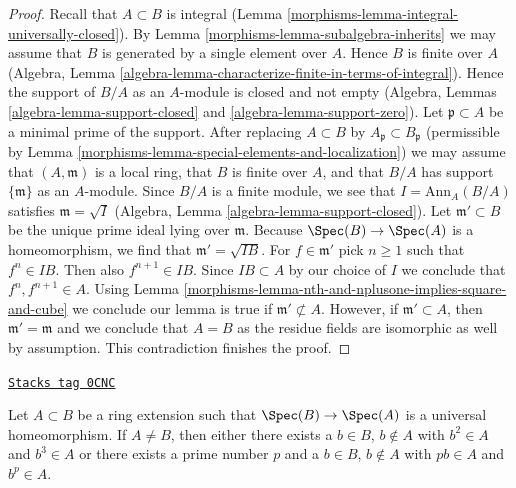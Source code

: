 \begin{proof}

Recall that $A \subset B$ is integral
(Lemma \ref{morphisms-lemma-integral-universally-closed}).
By Lemma \ref{morphisms-lemma-subalgebra-inherits}
we may assume that $B$ is generated by a single element
over $A$. Hence $B$ is finite over $A$
(Algebra, Lemma \ref{algebra-lemma-characterize-finite-in-terms-of-integral}).
Hence the support of $B/A$ as an $A$-module is
closed and not empty (Algebra, Lemmas
\ref{algebra-lemma-support-closed} and \ref{algebra-lemma-support-zero}).
Let $\mathfrak p \subset A$ be a minimal prime
of the support. After replacing $A \subset B$ by
$A_\mathfrak p \subset B_\mathfrak p$ (permissible by
Lemma \ref{morphisms-lemma-special-elements-and-localization})
we may assume that $(A, \mathfrak m)$ is a local ring,
that $B$ is finite over $A$, and that $B/A$ has support $\{\mathfrak m\}$
as an $A$-module. Since $B/A$ is a finite module,
we see that $I = \text{Ann}_A(B/A)$ satisfies $\mathfrak m = \sqrt{I}$
(Algebra, Lemma \ref{algebra-lemma-support-closed}).
Let $\mathfrak m' \subset B$ be the unique prime ideal lying over
$\mathfrak m$. Because $\Spec(B) \to \Spec(A)$ is a homeomorphism,
we find that $\mathfrak m' = \sqrt{IB}$.
For $f \in \mathfrak m'$ pick $n \geq 1$ such that
$f^n \in IB$. Then also $f^{n + 1} \in IB$.
Since $IB \subset A$ by our choice of $I$ we conclude that
$f^n, f^{n + 1} \in A$. Using
Lemma \ref{morphisms-lemma-nth-and-nplusone-implies-square-and-cube}
we conclude our lemma is true if $\mathfrak m' \not \subset A$.
However, if $\mathfrak m' \subset A$, then $\mathfrak m' = \mathfrak m$
and we conclude that $A = B$ as the residue fields
are isomorphic as well by assumption. This contradiction
finishes the proof.
\end{proof}

\begin{lemma}
\label{morphisms-lemma-pth-power-and-multiple}
\href{https://stacks.math.columbia.edu/tag/0CNC}{\texttt{Stacks tag 0CNC}}

Let $A \subset B$ be a ring extension such that $\Spec(B) \to \Spec(A)$
is a universal homeomorphism.
If $A \not = B$, then either there exists a $b \in B$, $b \not \in A$ with
$b^2 \in A$ and $b^3 \in A$ or there exists a prime number $p$
and a $b \in B$, $b \not \in A$ with $pb \in A$ and $b^p \in A$.
\end{lemma}

